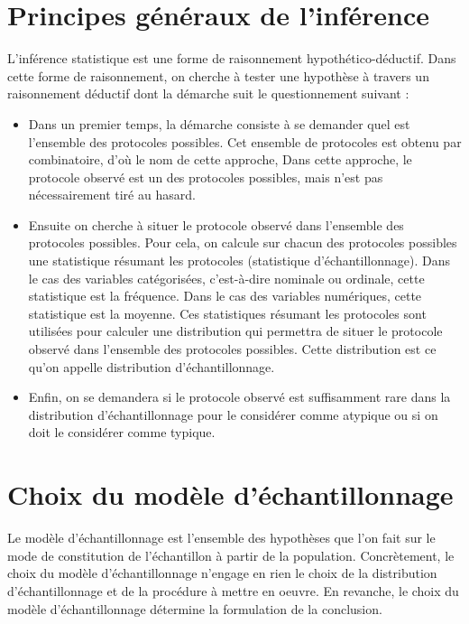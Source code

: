 \documentclass[]{book}
\providecommand{\tightlist}{%
  \setlength{\itemsep}{0pt}\setlength{\parskip}{0pt}}
\theoremstyle{definition}
\theoremstyle{definition}
\theoremstyle{definition}
\theoremstyle{remark}
\begin{document}
\hypertarget{principes-generaux-de-linference}{%
\section{Principes généraux de
l'inférence}\label{principes-generaux-de-linference}}

L'inférence statistique est une forme de raisonnement
hypothético-déductif. Dans cette forme de raisonnement, on cherche à
tester une hypothèse à travers un raisonnement déductif dont la démarche
suit le questionnement suivant :

\begin{itemize}
\tightlist
\item
  Dans un premier temps, la démarche consiste à se demander quel est
  l'ensemble des protocoles possibles. Cet ensemble de protocoles est
  obtenu par combinatoire, d'où le nom de cette approche, Dans cette
  approche, le protocole observé est un des protocoles possibles, mais
  n'est pas nécessairement tiré au hasard.
\item
  Ensuite on cherche à situer le protocole observé dans l'ensemble des
  protocoles possibles. Pour cela, on calcule sur chacun des protocoles
  possibles une statistique résumant les protocoles (statistique
  d'échantillonnage). Dans le cas des variables catégorisées,
  c'est-à-dire nominale ou ordinale, cette statistique est la fréquence.
  Dans le cas des variables numériques, cette statistique est la
  moyenne. Ces statistiques résumant les protocoles sont utilisées pour
  calculer une distribution qui permettra de situer le protocole observé
  dans l'ensemble des protocoles possibles. Cette distribution est ce
  qu'on appelle distribution d'échantillonnage.
\item
  Enfin, on se demandera si le protocole observé est suffisamment rare
  dans la distribution d'échantillonnage pour le considérer comme
  atypique ou si on doit le considérer comme typique.
\end{itemize}

\hypertarget{choix-du-modele-dechantillonnage}{%
\section{Choix du modèle
d'échantillonnage}\label{choix-du-modele-dechantillonnage}}

Le modèle d'échantillonnage est l'ensemble des hypothèses que l'on fait
sur le mode de constitution de l'échantillon à partir de la population.
Concrètement, le choix du modèle d'échantillonnage n'engage en rien le
choix de la distribution d'échantillonnage et de la procédure à mettre
en oeuvre. En revanche, le choix du modèle d'échantillonnage détermine
la formulation de la conclusion.
\end{document}
